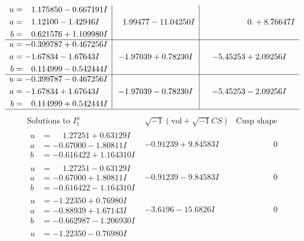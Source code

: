 \documentclass[1p]{elsarticle_modified}
\theoremstyle{definition}
\newcommand{\I}{\sqrt{-1}}
\begin{document}
$$\begin{array}{c|c|c}
\begin{aligned}
u &= \phantom{-}1.175850 - 0.667191 I \\
a &= \phantom{-}1.12100 - 1.42946 I \\
b &= \phantom{-}0.621576 + 1.109980 I\end{aligned}
 & \phantom{-}1.99477 - 11.04250 I & \phantom{-0.000000 -}0. + 8.76647 I \\ \hline\begin{aligned}
u &= -0.399787 + 0.467256 I \\
a &= -1.67834 - 1.67643 I \\
b &= \phantom{-}0.114999 - 0.542444 I\end{aligned}
 & -1.97039 + 0.78230 I & -5.45253 + 2.09256 I \\ \hline\begin{aligned}
u &= -0.399787 - 0.467256 I \\
a &= -1.67834 + 1.67643 I \\
b &= \phantom{-}0.114999 + 0.542444 I\end{aligned}
 & -1.97039 - 0.78230 I & -5.45253 - 2.09256 I\\
 \hline 
 \end{array}$$\newpage$$\begin{array}{c|c|c}  
\text{Solutions to }I^u_{1}& \I (\text{vol} + \sqrt{-1}CS) & \text{Cusp shape}\\
 \hline 
\begin{aligned}
u &= \phantom{-}1.27251 + 0.63129 I \\
a &= -0.67000 - 1.80811 I \\
b &= -0.616422 + 1.164310 I\end{aligned}
 & -0.91239 + 9.84583 I & \phantom{-0.000000 } 0 \\ \hline\begin{aligned}
u &= \phantom{-}1.27251 - 0.63129 I \\
a &= -0.67000 + 1.80811 I \\
b &= -0.616422 - 1.164310 I\end{aligned}
 & -0.91239 - 9.84583 I & \phantom{-0.000000 } 0 \\ \hline\begin{aligned}
u &= -1.22350 + 0.76980 I \\
a &= -0.88939 + 1.67143 I \\
b &= -0.662987 - 1.206930 I\end{aligned}
 & -3.6196 - 15.6826 I & \phantom{-0.000000 } 0 \\ \hline\begin{aligned}
u &= -1.22350 - 0.76980 I \\

\end{aligned}
\end{array}$$
\end{document}
